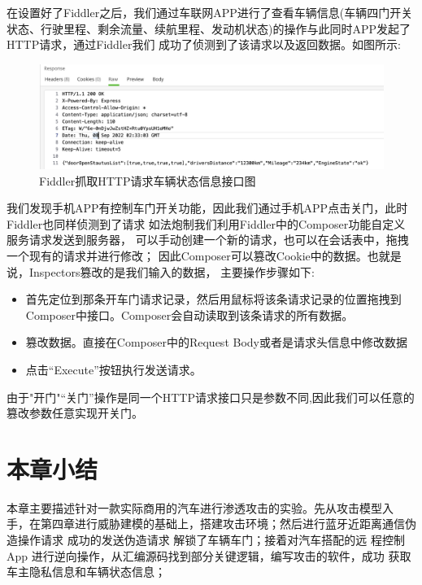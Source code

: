 在设置好了Fiddler之后，我们通过车联网APP进行了查看车辆信息(车辆四门开关状态、行驶里程、剩余流量、续航里程、发动机状态)的操作与此同时APP发起了HTTP请求，通过Fiddler我们
成功了侦测到了该请求以及返回数据。如图所示:
\begin{figure}
  \centering
  \includegraphics[scale=0.5]{resources/img/i26.png}
  \caption{Fiddler抓取HTTP请求车辆状态信息接口图}
\end{figure}
我们发现手机APP有控制车门开关功能，因此我们通过手机APP点击关门，此时Fiddler也同样侦测到了请求
如法炮制我们利用Fiddler中的Composer功能自定义服务请求发送到服务器，
可以手动创建一个新的请求，也可以在会话表中，拖拽一个现有的请求并进行修改；
因此Composer可以篡改Cookie中的数据。也就是说，Inspectors篡改的是我们输入的数据，
主要操作步骤如下:
\begin{itemize}
  \item 首先定位到那条开车门请求记录，然后用鼠标将该条请求记录的位置拖拽到Composer中接口。Composer会自动读取到该条请求的所有数据。
  \item 篡改数据。直接在Composer中的Request Body或者是请求头信息中修改数据
  \item 点击“Execute”按钮执行发送请求。
\end{itemize}
由于"开门"“关门”操作是同一个HTTP请求接口只是参数不同,因此我们可以任意的篡改参数任意实现开关门。

\section{本章小结}
本章主要描述针对一款实际商用的汽车进行渗透攻击的实验。先从攻击模型入
手，在第四章进行威胁建模的基础上，搭建攻击环境；然后进行蓝牙近距离通信伪造操作请求 成功的发送伪造请求 解锁了车辆车门；接着对汽车搭配的远
程控制 App 进行逆向操作，从汇编源码找到部分关键逻辑，编写攻击的软件，成功
获取车主隐私信息和车辆状态信息；
